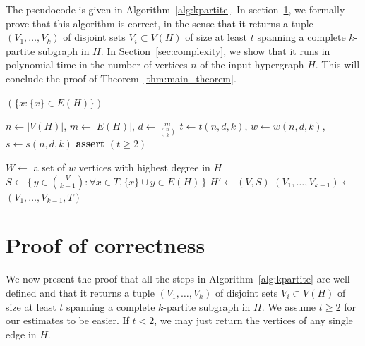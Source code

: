 \documentclass{amsart}
\begin{document}
    The pseudocode is given in Algorithm~\ref{alg:kpartite}.
    In section~\ref{sec:correctness}, we formally prove that this algorithm is correct,
    in the sense that it returns a tuple $(V_1, \dots, V_k)$ of disjoint sets $V_i \subset V(H)$
    of size at least $t$ spanning a complete $k$-partite subgraph in $H$.
    In Section~\ref{sec:complexity}, we
    show that it runs in polynomial time in the number of vertices $n$ of the input hypergraph $H$.
    This will conclude the proof of Theorem~\ref{thm:main_theorem}.

    \begin{algorithm}[H]
        \caption{Finding a balanced $k$-partite $k$-uniform subgraph}
        \label{alg:kpartite}
        \begin{algorithmic}[1]
                    \State \Return $(\{x \colon \{x\} \in E(H)\})$
                \EndIf

                \State $n \gets |V(H)|$, $m \gets |E(H)|$, $d \gets \frac{m}{\binom{n}{k}}$
                \State $t \gets t(n, d, k)$, $w \gets w(n, d, k)$, $s \gets s(n, d, k)$
                \State \textbf{assert} $(t \ge 2)$

                \State $W \gets$ a set of $w$ vertices with highest degree in $H$
                    \State $S \gets \{\,y \in \binom{V}{k-1} \colon \forall x \in T, \{x\} \cup y \in E(H)\,\}$
                        \State $H' \gets (V, S)$  
                        \State $(V_1, \dots, V_{k-1}) \gets$  \label{recurse}
                        \State \Return $(V_1, \dots, V_{k-1}, T)$
                    \EndIf
                \EndFor
            \EndFunction
        \end{algorithmic}
    \end{algorithm}

    \section{Proof of correctness}\label{sec:correctness}

    We now present the proof that
    all the steps in Algorithm~\ref{alg:kpartite} are well-defined and that
    it returns a tuple $(V_1, \dots, V_k)$ of disjoint sets $V_i \subset V(H)$
    of size at least $t$ spanning a complete $k$-partite subgraph in $H$.
    We assume $t \ge 2$ for our estimates to be easier.
    If $t < 2$, we may just return the vertices of any single edge in $H$.
\end{document}
